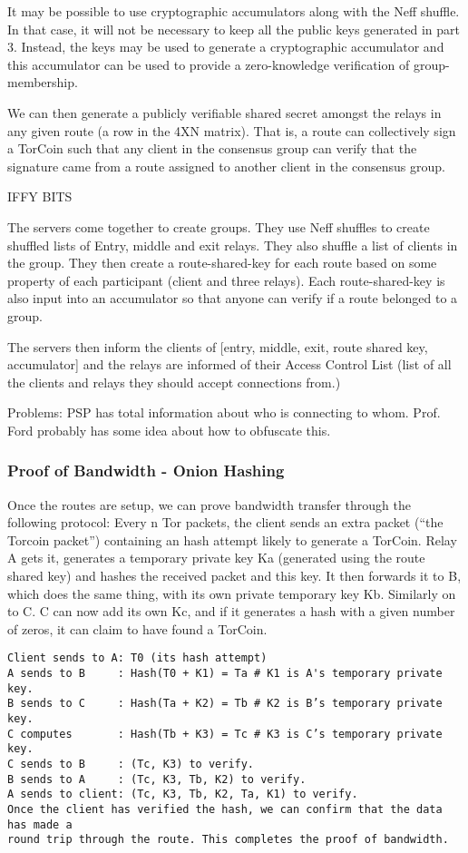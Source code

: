 It may be possible to use cryptographic accumulators along with the Neff shuffle. In that case, it will not be necessary to keep all the public keys generated in part 3. Instead, the keys may be used to generate a cryptographic accumulator and this accumulator can be used to provide a zero-knowledge verification of group-membership.

We can then generate a publicly verifiable shared secret amongst the relays in any given route (a row in the 4XN matrix). That is, a route can collectively sign a TorCoin such that any client in the consensus group can verify that the signature came from a route assigned to another client in the consensus group.

IFFY BITS

The servers come together to create groups. They use Neff shuffles to create shuffled lists of Entry, middle and exit relays. They also shuffle a list of clients in the group. They then create a route-shared-key for each route based on some property of each participant (client and three relays). Each route-shared-key is also input into an accumulator so that anyone can verify if a route belonged to a group.

The servers then inform the clients of [entry, middle, exit, route shared key, accumulator] and the relays are informed of their Access Control List (list of all the clients and relays they should accept connections from.)

Problems: PSP has total information about who is connecting to whom. Prof. Ford probably has some idea about how to obfuscate this.

\subsubsection{Proof of Bandwidth - Onion Hashing}
Once the routes are setup, we can prove bandwidth transfer through the following protocol:
Every n Tor packets, the client sends an extra packet (“the Torcoin packet”) containing an hash attempt likely to generate a TorCoin. Relay A gets it, generates a temporary private key Ka (generated using the route shared key) and hashes the received packet and this key. It then forwards it to B, which does the same thing, with its own private temporary key Kb. Similarly on to C. C can now add its own Kc, and if it generates a hash with a given number of zeros, it can claim to have found a TorCoin.
\begin{verbatim}
Client sends to A: T0 (its hash attempt)
A sends to B     : Hash(T0 + K1) = Ta # K1 is A's temporary private key.
B sends to C     : Hash(Ta + K2) = Tb # K2 is B’s temporary private key.
C computes       : Hash(Tb + K3) = Tc # K3 is C’s temporary private key.
C sends to B     : (Tc, K3) to verify.
B sends to A     : (Tc, K3, Tb, K2) to verify.
A sends to client: (Tc, K3, Tb, K2, Ta, K1) to verify.
Once the client has verified the hash, we can confirm that the data has made a 
round trip through the route. This completes the proof of bandwidth.
\end{verbatim}

